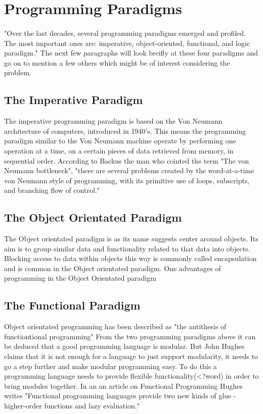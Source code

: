 \documentclass{report}
\begin{document}
\section{Programming Paradigms}
\paragraph{}"Over the last decades, several programming paradigms emerged and profiled. The most important ones are: imperative, object-oriented, functional, and logic paradigm."\cite{Vujosevic2008} The next few paragraphs will look breifly at these four paradigms and go on to mention a few others which might be of interest considering the problem.
\subsection{The Imperative Paradigm}
The imperative programming paradigm is based on the Von Neumann architecture of computers, introduced in 1940’s. \cite{Vujosevic2008} This means the programming paradigm similar to the Von Neumann machine operate by performing one operation at a time, on a certain pieces of data retrieved from memory, in sequential order. According to Backus \cite{Backus1978} the man who cointed the term "The von Neumann bottleneck", "there are several problems created by the word-at-a-time von Neumann style of programming, with its primitive use of loops, subscripts, and branching flow of control."
\subsection{The Object Orientated Paradigm}
The Object orientated paradigm is as its name suggests center around objects. Its aim is to group similar data and functionality related to that data into objects. Blocking access to data within objects this way is commonly called encapsulation and is common in the Object orientated paradigm.
One advantages of programming in the Object Orientated paradigm %
\subsection{The Functional Paradigm}
Object orientated programming has been described as "the antithesis of functiontional programming" \cite{Taivalsaari1993} From the two programming paradigms above it can be deduced that a good programming language is modular. But John Hughes claims that it is not enough for a language to just support modularity, it needs to go a step further and make modular programming easy. To do this a programming language needs to provide flexible functionality(<?word) in order to bring modules together. In an an article on Functional Programming Hughes writes "Functional programming languages provide two new kinds of glue - higher-order functions and lazy evaluation."\cite{Hughes1984} %
\end{document}

